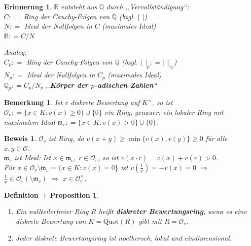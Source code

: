 \documentclass[a4paper,12pt]{scrbook}
\theoremstyle{break}
\newtheorem{Bem}[Def]{Bemerkung}
\newtheorem{DefProp}[Def]{Definition + Proposition}
\theoremstyle{nonumberbreak}
\newtheorem{Bew}{Beweis}
\newtheorem{Eri}{Erinnerung}
\theoremstyle{nonumberplain}
\newcommand{\emp}[1]{\textbf{\emph{#1}}}
\newcommand{\defeqr}[0]{\mathrel{\mathop:}=}
\begin{document}
\begin{Eri}
$\mathbb{R}$ entsteht aus $\mathbb{Q}$ durch ,,Vervollständigung``:\\
$C \defeqr$ Ring der Cauchy-Folgen von $\mathbb{Q}$ (bzgl. $|\;\,|$)\\
$N \defeqr$ Ideal der Nullfolgen in $C$ (maximales Ideal)\\
$\mathbb{R} \defeqr C/N$

Analog:\\
$C_p \defeqr$ Ring der Cauchy-Folgen von $\mathbb{Q}$ (bzgl. $|\;\,|_p \defeqr |\;\,|_{v_p}$)\\
$N_p \defeqr$ Ideal der Nullfolgen in $C_p$ (maximales Ideal)\\
$\mathbb{Q}_p \defeqr C_p/N_p$ ,,\emp{Körper der $p$-adischen Zahlen}``
\end{Eri}

\begin{Bem}
Ist $v$ diskrete Bewertung auf $K^{\times}$, so ist $\mathcal{O}_v \defeqr \{x
\in K: v(x) \geq 0\} \cup \{0\}$ ein Ring, genauer: ein lokaler Ring mit
maximalem Ideal $\mathfrak{m}_v \defeqr \{ x \in K: v(x) > 0\} \cup \{0\}$.
\end{Bem}

\begin{Bew} 
$\mathcal{O}_v$ ist Ring, da $v(x+y) \geq \min\{v(x),v(y)\} \geq 0$ für alle
$x,y \in \mathcal{O}$.\\
$\mathfrak{m}_v$ ist Ideal: Ist $x \in \mathfrak{m}_v, \; r \in \mathcal{O}_v$, so ist $v(x \cdot r) =
v(x) + v(r) > 0$.\\
Für $x \in \mathcal{O}_v \setminus \mathfrak{m}_v = \{x \in K: v(x) = 0\}$
ist $v(\frac{1}{x})=-v(x)=0$ $\Rightarrow$ $\frac{1}{x} \in \mathcal{O}_v(\setminus
\mathfrak{m}_v)$ $\Rightarrow$ $x \in \mathcal{O}_v^{\times}$.
\end{Bew}

\begin{DefProp}
\label{2.38}
\begin{enumerate}
  \item Ein nullteilerfreier Ring $R$ heißt \emp{diskreter
  Bewertungsring}, wenn es eine diskrete
  Bewertung von $K = \mathrm{Quot}(R)$ gibt mit $R = \mathcal{O}_v$.
  \item Jeder diskrete Bewertungsring ist noethersch, lokal und eindimensional.
\end{enumerate}
\end{DefProp}
\end{document}
